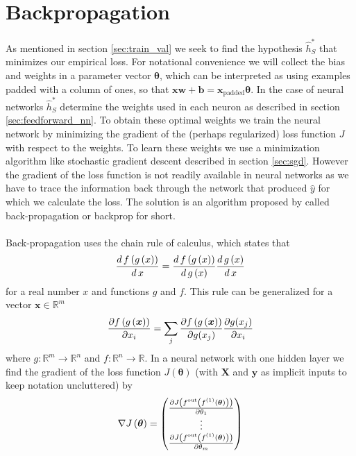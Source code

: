 \section{Backpropagation} \label{sec:backprop}
As mentioned in section \ref{sec:train_val} we seek to find the hypothesis $\hat{h}^*_S$ that minimizes our empirical loss. For notational convenience we will collect the bias and weights in a parameter vector $\boldsymbol{\theta}$, which can be interpreted as using examples padded with a column of ones, so that $\boldsymbol{x}\boldsymbol{w}+\boldsymbol{b} = \boldsymbol{x}_{\text{padded}} \boldsymbol{\theta}$. In the case of neural networks $\hat{h}^*_S$ determine the weights used in each neuron as described in section \ref{sec:feedforward_nn}. To obtain these optimal weights we train the neural network by minimizing the gradient of the (perhaps regularized) loss function $J$ with respect to the weights. To learn these weights we use a minimization algorithm like stochastic gradient descent described in section \ref{sec:sgd}. However the gradient of the loss function is not readily available in neural networks as we have to trace the information back through the network that produced $\hat{y}$ for which we calculate the loss. The solution is an algorithm proposed by \cite{Rumelhart:1986a} called back-propagation or backprop for short.\\
\\
Back-propagation uses the chain rule of calculus, which states that
\begin{equation*}
    \frac{d \, f\left (g\left (x\right)\right)}{d \, x} = \frac{d \, f\left (g\left (x\right)\right)}{d \, g \left (x\right)} \frac{d \, g\left (x\right)}{d \, x}
\end{equation*}
for a real number $x$ and functions $g$ and $f$. This rule can be generalized for a vector $\boldsymbol{x} \in \mathbb{R}^m$
\begin{equation*}
    \frac{\partial f\left (g\left (\boldsymbol{x}\right)\right)}{\partial x_i} = \sum_j \frac{\partial f\left (g\left (\boldsymbol{x}\right)\right)}{\partial g(x_j)} \frac{\partial g(x_j)}{\partial x_i}
\end{equation*}
where $g: \mathbb{R}^m \rightarrow \mathbb{R}^n$ and $f: \mathbb{R}^n \rightarrow \mathbb{R}$. In a neural network with one hidden layer we find the gradient of the loss function $J(\boldsymbol{\theta})$ (with $\boldsymbol{X}$ and $\boldsymbol{y}$ as implicit inputs to keep notation uncluttered) by
\begin{equation} \label{eq:loss_grad}
    \nabla J\left (\boldsymbol{\theta}\right) = \begin{pmatrix}
    \frac{\partial J\left (f^{\text{out}} \left (f^{(1)}\left (\boldsymbol{\theta}\right)\right)\right)}{\partial \theta_1} \\
    \vdots\\
    \frac{\partial J\left (f^{\text{out}} \left (f^{(1)}\left (\boldsymbol{\theta}\right)\right)\right)}{\partial \theta_m}
    \end{pmatrix}
\end{equation}
